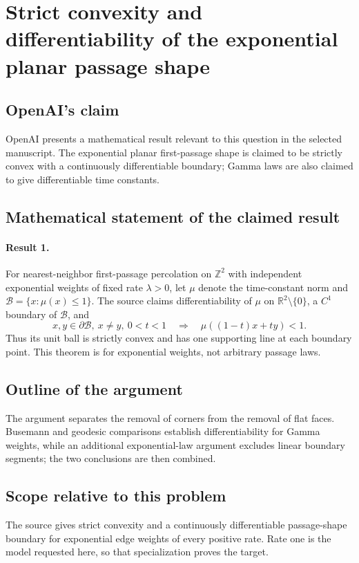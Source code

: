 \documentclass[11pt]{article}
\begin{document}
\section*{Strict convexity and differentiability of the exponential planar passage shape}

\subsection{OpenAI's claim}
OpenAI presents a mathematical result relevant to this question in the selected manuscript. The exponential planar first-passage shape is claimed to be strictly convex with a continuously differentiable boundary; Gamma laws are also claimed to give differentiable time constants.

\subsection{Mathematical statement of the claimed result}
\paragraph{Result 1.} For nearest-neighbor first-passage percolation on \(\mathbb Z^2\) with independent exponential weights of fixed rate \(\lambda>0\), let \(\mu\) denote the time-constant norm and \(\mathcal B=\{x:\mu(x)\le1\}\). The source claims differentiability of \(\mu\) on \(\mathbb R^2\setminus\{0\}\), a \(C^1\) boundary of \(\mathcal B\), and
\[
 x,y\in\partial\mathcal B,\ x\ne y,\ 0<t<1
 \quad\Longrightarrow\quad\mu((1-t)x+ty)<1.
\]
Thus its unit ball is strictly convex and has one supporting line at each boundary point. This theorem is for exponential weights, not arbitrary passage laws.

\subsection{Outline of the argument}
The argument separates the removal of corners from the removal of flat faces. Busemann and geodesic comparisons establish differentiability for Gamma weights, while an additional exponential-law argument excludes linear boundary segments; the two conclusions are then combined.

\subsection{Scope relative to this problem}
The source gives strict convexity and a continuously differentiable passage-shape boundary for exponential edge weights of every positive rate. Rate one is the model requested here, so that specialization proves the target.
\end{document}
